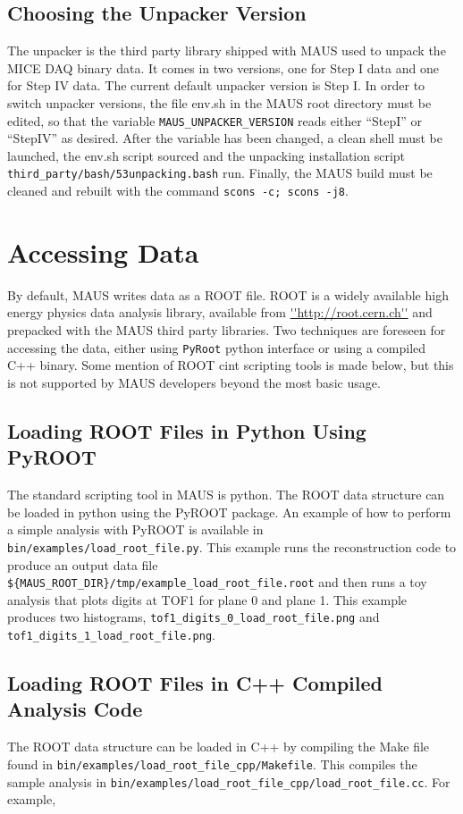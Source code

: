 \subsection{Choosing the Unpacker Version}
The unpacker is the third party library shipped with MAUS used to unpack the MICE DAQ binary data.  It comes in two versions, one for Step I data and one for Step IV data.  The current default unpacker version is Step I.  In order to switch unpacker versions, the file env.sh in the MAUS root directory must be edited, so that the variable \texttt{MAUS\_UNPACKER\_VERSION} reads either ``StepI'' or ``StepIV'' as desired. After the variable has been changed, a clean shell must be launched, the env.sh script sourced and the unpacking installation script \texttt{third\_party/bash/53unpacking.bash} run. Finally, the MAUS build must be cleaned and rebuilt with the command \texttt{scons -c; scons -j8}.

\section{Accessing Data}
By default, MAUS writes data as a ROOT file. ROOT is a widely available high energy physics data analysis library, available from \url{''http://root.cern.ch''} and prepacked with the MAUS third party libraries. Two techniques are foreseen for accessing the data, either using \verb|PyRoot| python interface or using a compiled C++ binary. Some mention of ROOT cint scripting tools is made below, but this is not supported by MAUS developers beyond the most basic usage.

\subsection{Loading ROOT Files in Python Using PyROOT}
The standard scripting tool in MAUS is python. The ROOT data structure can be loaded in python using the PyROOT package. An example of how to perform a simple analysis with PyROOT is available in \verb|bin/examples/load_root_file.py|. This example runs the reconstruction code to produce an output data file \verb|${MAUS_ROOT_DIR}/tmp/example_load_root_file.root| and then runs a toy analysis that plots digits at TOF1 for plane 0 and plane 1. This example produces two histograms, \verb|tof1_digits_0_load_root_file.png| and \verb|tof1_digits_1_load_root_file.png|.

\subsection{Loading ROOT Files in C++ Compiled Analysis Code}
The ROOT data structure can be loaded in C++ by compiling the Make file found in \verb|bin/examples/load_root_file_cpp/Makefile|. This compiles the sample analysis in \verb|bin/examples/load_root_file_cpp/load_root_file.cc|. For example,

